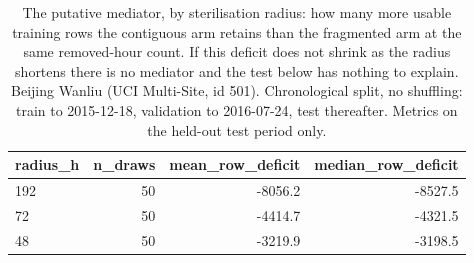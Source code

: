 \begin{table}[htbp]
\caption{The putative mediator, by sterilisation radius: how many more usable training rows the contiguous arm retains than the fragmented arm at the same removed-hour count. If this deficit does not shrink as the radius shortens there is no mediator and the test below has nothing to explain. Beijing Wanliu (UCI Multi-Site, id 501). Chronological split, no shuffling: train to 2015-12-18, validation to 2016-07-24, test thereafter. Metrics on the held-out test period only.}
\label{tab:mediation_mediator}
\begin{tabular}{lrrr}
\toprule
radius\_h & n\_draws & mean\_row\_deficit & median\_row\_deficit \\
\midrule
192 & 50 & -8056.2 & -8527.5 \\
72 & 50 & -4414.7 & -4321.5 \\
48 & 50 & -3219.9 & -3198.5 \\
\bottomrule
\end{tabular}
\end{table}
